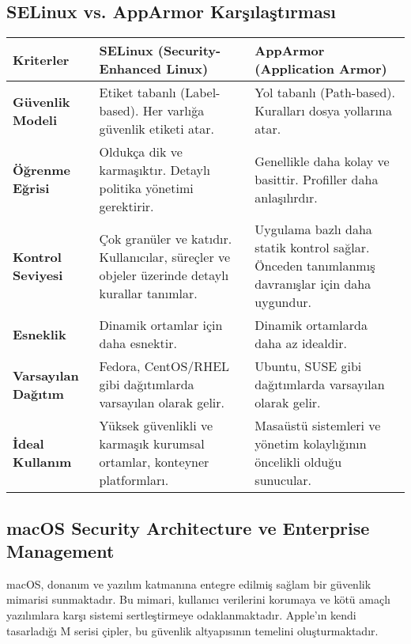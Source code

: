 \subsection{SELinux vs. AppArmor Karşılaştırması}

\begin{longtable}{|p{4.5cm}|p{4.5cm}|p{4.5cm}|}

\hline

\textbf{Kriterler} & \textbf{SELinux (Security-Enhanced Linux)} & \textbf{AppArmor (Application Armor)} \\
\hline
\textbf{Güvenlik Modeli} & Etiket tabanlı (Label-based). Her varlığa güvenlik etiketi atar. & Yol tabanlı (Path-based). Kuralları dosya yollarına atar. \\
\hline
\textbf{Öğrenme Eğrisi} & Oldukça dik ve karmaşıktır. Detaylı politika yönetimi gerektirir. & Genellikle daha kolay ve basittir. Profiller daha anlaşılırdır. \\
\hline
\textbf{Kontrol Seviyesi} & Çok granüler ve katıdır. Kullanıcılar, süreçler ve objeler üzerinde detaylı kurallar tanımlar. & Uygulama bazlı daha statik kontrol sağlar. Önceden tanımlanmış davranışlar için daha uygundur. \\
\hline
\textbf{Esneklik} & Dinamik ortamlar için daha esnektir. & Dinamik ortamlarda daha az idealdir. \\
\hline
\textbf{Varsayılan Dağıtım} & Fedora, CentOS/RHEL gibi dağıtımlarda varsayılan olarak gelir. & Ubuntu, SUSE gibi dağıtımlarda varsayılan olarak gelir. \\
\hline
\textbf{İdeal Kullanım} & Yüksek güvenlikli ve karmaşık kurumsal ortamlar, konteyner platformları. & Masaüstü sistemleri ve yönetim kolaylığının öncelikli olduğu sunucular. \\
\hline
\end{longtable}

\subsection{macOS Security Architecture ve Enterprise Management}

macOS, donanım ve yazılım katmanına entegre edilmiş sağlam bir güvenlik mimarisi sunmaktadır. Bu mimari, kullanıcı verilerini korumaya ve kötü amaçlı yazılımlara karşı sistemi sertleştirmeye odaklanmaktadır. Apple'ın kendi tasarladığı M serisi çipler, bu güvenlik altyapısının temelini oluşturmaktadır.


